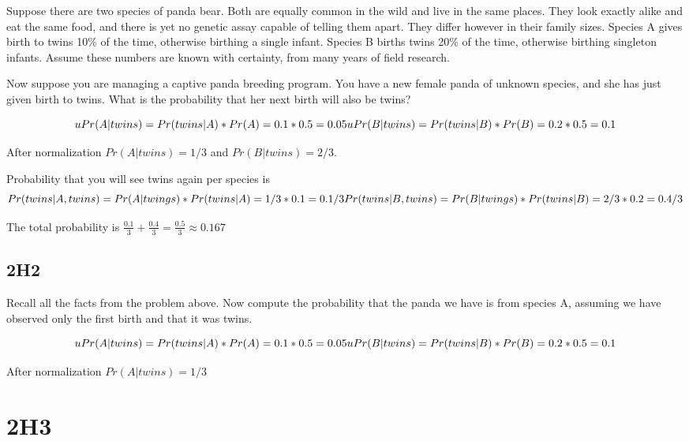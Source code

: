 \documentclass[
]{book}
\begin{document}
Suppose there are two species of panda bear. Both are equally common in the wild and live in the same places. They look exactly alike and eat the same food, and there is yet no genetic assay capable of telling them apart. They differ however in their family sizes. Species A gives birth to twins 10\% of the time, otherwise birthing a single infant. Species B births twins 20\% of the time, otherwise birthing singleton infants. Assume these numbers are known with certainty, from many years of field research.

Now suppose you are managing a captive panda breeding program. You have a new female panda of unknown species, and she has just given birth to twins. What is the probability that her next birth will also be twins?

\[uPr(A | twins) = Pr(twins | A) * Pr(A) = 0.1 * 0.5 = 0.05 \\
uPr(B | twins) = Pr(twins | B) * Pr(B) = 0.2 * 0.5 = 0.1\]

After normalization \(Pr(A | twins) = 1/3\) and \(Pr(B | twins) = 2/3\).

Probability that you will see twins again per species is
\[Pr(twins | A, twins) = Pr(A | twings) * Pr (twins | A) = 1 / 3 * 0.1  = 0.1 / 3 \\
Pr(twins | B, twins) = Pr(B | twings) * Pr (twins | B) = 2 / 3 * 0.2 = 0.4 / 3\]

The total probability is \(\frac{0.1}{3} + \frac{0.4}{3} = \frac{0.5}{3} \approx 0.167\)

\hypertarget{h2}{%
\subsection*{2H2}\label{h2}}

Recall all the facts from the problem above. Now compute the probability that the panda we have is from species A, assuming we have observed only the first birth and that it was twins.

\[uPr(A | twins) = Pr(twins | A) * Pr(A) = 0.1 * 0.5 = 0.05 \\
uPr(B | twins) = Pr(twins | B) * Pr(B) = 0.2 * 0.5 = 0.1\]

After normalization \(Pr(A | twins) = 1/3\)

\hypertarget{h3}{%
\section*{2H3}\label{h3}}
\end{document}
